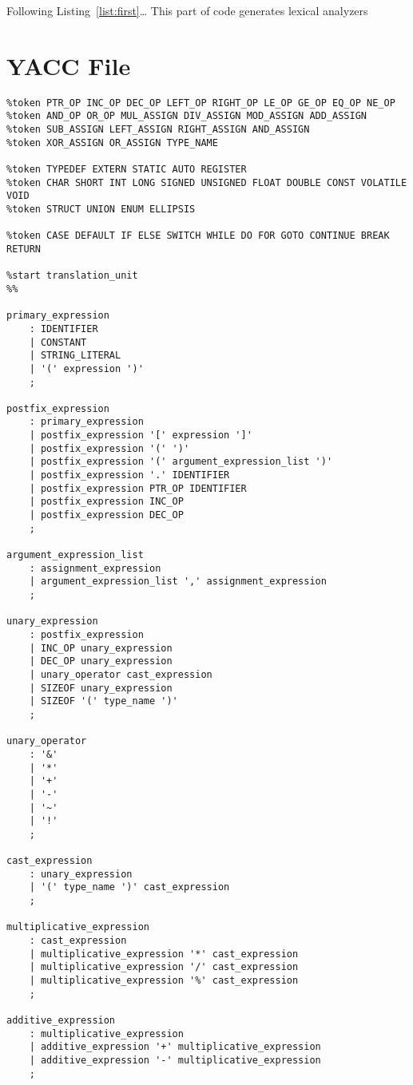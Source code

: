 \documentclass[a4paper,11pt]{article}
\theoremstyle{mytheor}
\begin{document}
Following Listing~\ref{list:first}\ldots{} 
This part of code generates lexical analyzers 
\section*{YACC File}

\begin{lstlisting}[label={list:second},caption=Yacc code.]
%token IDENTIFIER CONSTANT STRING_LITERAL SIZEOF
%token PTR_OP INC_OP DEC_OP LEFT_OP RIGHT_OP LE_OP GE_OP EQ_OP NE_OP
%token AND_OP OR_OP MUL_ASSIGN DIV_ASSIGN MOD_ASSIGN ADD_ASSIGN
%token SUB_ASSIGN LEFT_ASSIGN RIGHT_ASSIGN AND_ASSIGN
%token XOR_ASSIGN OR_ASSIGN TYPE_NAME

%token TYPEDEF EXTERN STATIC AUTO REGISTER
%token CHAR SHORT INT LONG SIGNED UNSIGNED FLOAT DOUBLE CONST VOLATILE VOID
%token STRUCT UNION ENUM ELLIPSIS

%token CASE DEFAULT IF ELSE SWITCH WHILE DO FOR GOTO CONTINUE BREAK RETURN

%start translation_unit
%%

primary_expression
	: IDENTIFIER
	| CONSTANT
	| STRING_LITERAL
	| '(' expression ')'
	;

postfix_expression
	: primary_expression
	| postfix_expression '[' expression ']'
	| postfix_expression '(' ')'
	| postfix_expression '(' argument_expression_list ')'
	| postfix_expression '.' IDENTIFIER
	| postfix_expression PTR_OP IDENTIFIER
	| postfix_expression INC_OP
	| postfix_expression DEC_OP
	;

argument_expression_list
	: assignment_expression
	| argument_expression_list ',' assignment_expression
	;

unary_expression
	: postfix_expression
	| INC_OP unary_expression
	| DEC_OP unary_expression
	| unary_operator cast_expression
	| SIZEOF unary_expression
	| SIZEOF '(' type_name ')'
	;

unary_operator
	: '&'
	| '*'
	| '+'
	| '-'
	| '~'
	| '!'
	;

cast_expression
	: unary_expression
	| '(' type_name ')' cast_expression
	;

multiplicative_expression
	: cast_expression
	| multiplicative_expression '*' cast_expression
	| multiplicative_expression '/' cast_expression
	| multiplicative_expression '%' cast_expression
	;

additive_expression
	: multiplicative_expression
	| additive_expression '+' multiplicative_expression
	| additive_expression '-' multiplicative_expression
	;


\end{lstlisting}
\end{document}
